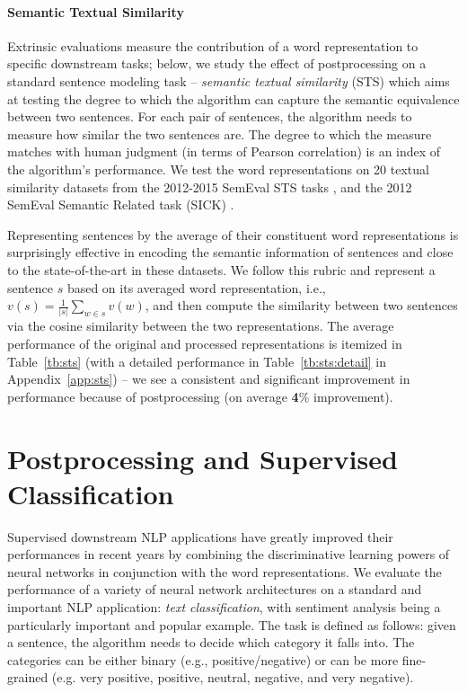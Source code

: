 \documentclass{article} \usepackage{acl2017,times}
\begin{document}
\paragraph{Semantic Textual Similarity}

Extrinsic evaluations measure the contribution of a word representation to specific downstream tasks; below, we study the effect of postprocessing on a standard sentence modeling task --   {\em semantic textual similarity} (STS) which aims at testing the degree to which the algorithm can capture the semantic equivalence between two sentences. For each pair of sentences, the algorithm needs to measure how similar the two sentences are. The degree to which the measure matches with  human judgment (in terms of Pearson correlation) is an index of the algorithm's performance.  
We test the word representations on  20 textual similarity datasets from the 2012-2015 SemEval STS tasks \citep{agirre2012semeval,agirre2013sem,agirre2014semeval,agirrea2015semeval}, and the 2012 SemEval Semantic Related task (SICK) \citep{marelli2014sick}. 

Representing  sentences by the average of their constituent word representations is surprisingly effective in encoding the semantic information of sentences
\citep{wieting2015paraphrase,adi2016fine} and close to the state-of-the-art in these datasets. We follow this rubric and represent a sentence $s$ based on its averaged word representation, i.e., $v(s) = \frac{1}{|s|}\sum_{w\in s} v(w)$, and then compute the similarity between two sentences via the cosine similarity between the two representations.  
The average performance of the original and processed representations is itemized in Table~\ref{tb:sts} (with a detailed performance in Table~\ref{tb:sts:detail} in Appendix~\ref{app:sts}) -- we see a consistent and significant improvement in performance because of postprocessing (on average {\bf 4}\% improvement).

\section{Postprocessing and Supervised Classification}
Supervised downstream NLP applications have greatly improved their performances  in recent years by combining the discriminative learning powers of neural networks in conjunction with the word  representations. We evaluate the performance of a variety of neural network architectures on a standard and important NLP application: {\em text classification}, with 
 sentiment analysis being a particularly important and popular example. The task is defined as follows: given a sentence, the algorithm needs to decide which category it falls into. The categories can be either binary (e.g., positive/negative) or can be more fine-grained (e.g. very positive, positive, neutral, negative, and very negative). 
\end{document}
